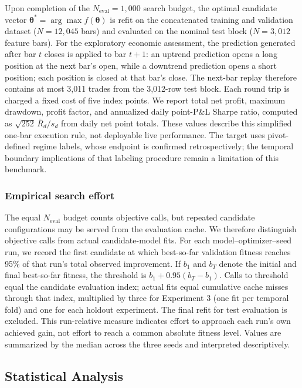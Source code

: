 Upon completion of the $N_{\mathrm{eval}} = 1{,}000$ search budget, the optimal candidate vector $\boldsymbol{\theta}^* = \arg\max f(\boldsymbol{\theta})$ is refit on the concatenated training and validation dataset ($N = 12{,}045$ bars) and evaluated on the nominal test block ($N = 3{,}012$ feature bars). For the exploratory economic assessment, the prediction generated after bar $t$ closes is applied to bar $t+1$: an uptrend prediction opens a long position at the next bar's open, while a downtrend prediction opens a short position; each position is closed at that bar's close. The next-bar replay therefore contains at most 3,011 trades from the 3,012-row test block. Each round trip is charged a fixed cost of five index points. We report total net profit, maximum drawdown, profit factor, and annualized daily point-P\&L Sharpe ratio, computed as $\sqrt{252}\,\bar{R}_{d}/s_{d}$ from daily net point totals. These values describe this simplified one-bar execution rule, not deployable live performance. The target uses pivot-defined regime labels, whose endpoint is confirmed retrospectively; the temporal boundary implications of that labeling procedure remain a limitation of this benchmark.

\subsubsection{Empirical search effort}
\label{sec:empirical_effort}
The equal $N_{\mathrm{eval}}$ budget counts objective calls, but repeated candidate configurations may be served from the evaluation cache. We therefore distinguish objective calls from actual candidate-model fits. For each model--optimizer--seed run, we record the first candidate at which best-so-far validation fitness reaches 95\% of that run's total observed improvement. If $b_1$ and $b_T$ denote the initial and final best-so-far fitness, the threshold is $b_1+0.95(b_T-b_1)$. Calls to threshold equal the candidate evaluation index; actual fits equal cumulative cache misses through that index, multiplied by three for Experiment 3 (one fit per temporal fold) and one for each holdout experiment. The final refit for test evaluation is excluded. This run-relative measure indicates effort to approach each run's own achieved gain, not effort to reach a common absolute fitness level. Values are summarized by the median across the three seeds and interpreted descriptively.

\subsection{Statistical Analysis}
\label{sec:statistical_analysis}

